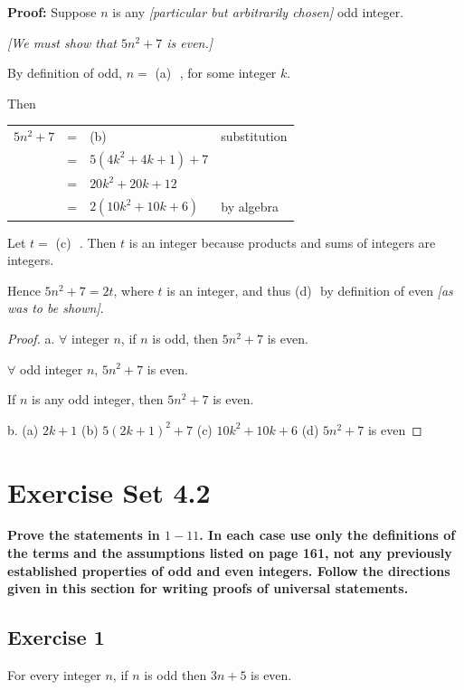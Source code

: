 \documentclass[14pt]{extarticle}
\newcommand{\fbl}{\underline{\hspace{1cm}}\,\,}
\newcommand{\fa}{\forall}
\newcommand{\cy}{\color{cyan}}
\begin{document}
{\bf Proof:} Suppose $n$ is any {\it [particular but arbitrarily chosen]} odd integer. 

{\it [We must show that $5n^2 + 7$ is even.]}

By definition of odd, $n = $ {\cy (a)} \fbl, for some integer $k$. 

Then

\begin{center}
\begin{tabular}{rcll}
$5n^2 + 7$ & = & {\cy (b)} \fbl & \cy substitution \\
& = & $5(4k^2 + 4k + 1) + 7$ & \\
& = & $20k^2 + 20k + 12$ & \\
& = & $2(10k^2 + 10k + 6)$ & \cy by algebra \\
\end{tabular}
\end{center}

Let $t = $ {\cy (c)} \fbl. Then $t$ is an integer because products and sums of integers are integers. 

Hence $5n^2 + 7 = 2t$, where $t$ is an integer, and thus {\cy (d)} \fbl by definition of even {\it [as was to be shown]}.

\begin{proof}
a. $\fa$ integer $n$, if $n$ is odd, then $5n^2+7$ is even.

$\fa$ odd integer $n$, $5n^2+7$ is even.

If $n$ is any odd integer, then $5n^2+7$ is even.

b. (a) $2k+1$ (b) $5(2k+1)^2 + 7$ (c) $10k^2 + 10k + 6$ (d) $5n^2+7$ is even
\end{proof}

\section{Exercise Set 4.2}

{\bf \cy Prove the statements in $1-11$. In each case use only the definitions of the terms and the assumptions listed on page 161, not any previously established properties of odd and even integers. Follow the directions given in this section for writing proofs of universal statements.}

\subsection{Exercise 1}
For every integer $n$, if $n$ is odd then $3n + 5$ is even.
\end{document}
